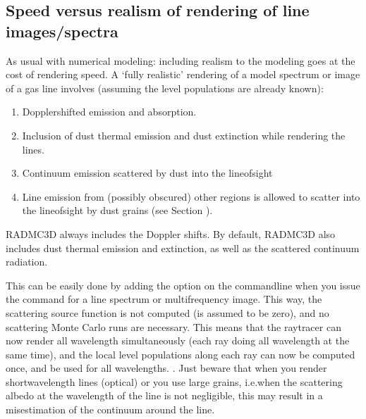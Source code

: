 \documentclass[letterpaper,10pt,english]{sphinxmanual}
\begin{document}
\subsection{Speed versus realism of rendering of line images/spectra}
\label{\detokenize{lineradtrans:speed-versus-realism-of-rendering-of-line-images-spectra}}\label{\detokenize{lineradtrans:sec-line-render-speed-realism}}
As usual with numerical modeling: including realism to the modeling goes at
the cost of rendering speed. A ‘fully realistic’ rendering of a model
spectrum or image of a gas line involves (assuming the level populations
are already known):
\begin{enumerate}
%
\item {} 
Doppler\sphinxhyphen{}shifted emission and absorption.

\item {} 
Inclusion of dust thermal emission and dust extinction while rendering
the lines.

\item {} 
Continuum emission scattered by dust into the line\sphinxhyphen{}of\sphinxhyphen{}sight

\item {} 
Line emission from (possibly obscured) other regions is allowed to
scatter into the line\sphinxhyphen{}of\sphinxhyphen{}sight by dust grains (see Section
{\hyperref[\detokenize{lineradtrans:sec-line-scat-off-dust}]{}}).

\end{enumerate}

RADMC\sphinxhyphen{}3D always includes the Doppler shifts. By default, RADMC\sphinxhyphen{}3D also
includes dust thermal emission and extinction, as well as the scattered
continuum radiation.

 This can be easily done by adding the 
option on the command\sphinxhyphen{}line when you issue the command for a line spectrum or
multi\sphinxhyphen{}frequency image. This way, the scattering source function is not
computed (is assumed to be zero), and no scattering Monte Carlo runs are
necessary. This means that the ray\sphinxhyphen{}tracer can now render all wavelength
simultaneously (each ray doing all wavelength at the same time), and the
local level populations along each ray can now be computed once, and be used
for all wavelengths. . Just beware that when you render
short\sphinxhyphen{}wavelength lines (optical) or you use large grains, i.e.when the
scattering albedo at the wavelength of the line is not negligible, this may
result in a mis\sphinxhyphen{}estimation of the continuum around the line.
\end{document}
